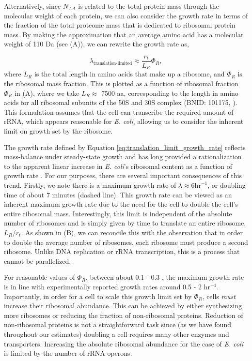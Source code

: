 Alternatively, since $N_{AA}$ is related to the total protein mass through the
molecular weight of each protein, we can also consider the growth rate in terms
of the fraction of the total proteome mass that is dedicated to ribosomal protein mass. By making the approximation that an average amino
acid has a molecular weight of 110 Da (see (A)), we can
rewrite the growth rate as,

\begin{equation}
\lambda_{\textrm{translation-limited}} \approx \frac{r_t}{L_R}  \Phi_R,
\label{eq:translation_limit_growth_rate}
\end{equation}
where $L_R$ is the total length in amino acids that make up a ribosome, and
$\Phi_R$ is the ribosomal mass fraction. This is plotted as a function of
ribosomal fraction $\Phi_R$ in (A), where we take $L_R
\approx$ 7500 aa, corresponding to the length in amino acids for all ribosomal
subunits of the 50S and 30S complex (BNID: 101175, \citep{milo2010}). This
formulation assumes that the cell can transcribe the required amount of rRNA,
which appears reasonable for \textit{E. coli}, allowing us to
consider the inherent limit on growth set by the ribosome.

The growth rate defined by Equation \ref{eq:translation_limit_growth_rate}
reflects mass-balance under steady-state growth and has long provided a
rationalization to the apparent linear increase in \textit{E. coli}'s
ribosomal content as a function of growth rate \citep{Goldberger1979,
scott2010}. For our purposes, there are several important consequences of
this trend. Firstly, we note there is a maximum growth rate of $\lambda
\approx 6 \text{hr}^{-1}$, or doubling time of about 7 minutes (dashed line).
This growth rate can be viewed as an inherent maximum growth rate due to the
need for the cell to double the cell's entire ribosomal mass. Interestingly,
this limit is independent of the absolute number of ribosomes and is simply
given by time to translate an entire ribosome, $L_R/ r_t$. As shown in
(B), we can reconcile this with the observation that in
order to double the average number of ribosomes, each ribosome must produce a
second ribosome. Unlike DNA replication or rRNA transcription, this is a
process that cannot be parallelized.

For reasonable values of $\Phi_R$, between about 0.1 - 0.3 \citep{scott2010},
the maximum growth rate is in line with experimentally reported growth rates
around 0.5 - 2 hr$^{-1}$. 
Importantly, in order for a cell to scale this growth
limit set by $\Phi_R$, cells \textit{must} increase their ribosomal abundance.
This can be achieved by either synthesizing more ribosomes or reducing the
fraction of non-ribosomal proteins. Reduction of non-ribosomal proteins is not
a straightforward task since (as we have found throughout our estimates) doubling a
cell requires many other enzymes and transporters. Increasing the absolute
ribosomal abundance for the case of \textit{E. coli} is limited by the number of
rRNA operons.


